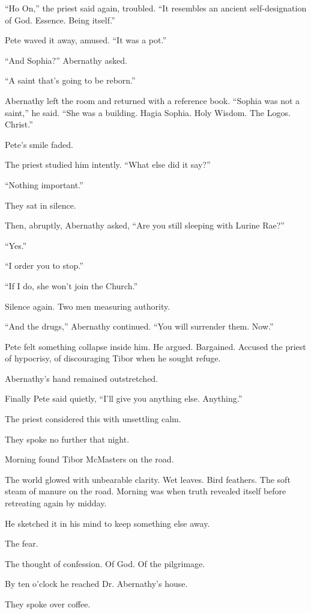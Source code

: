 “Ho On,” the priest said again, troubled. “It resembles an ancient self-designation of God. Essence. Being itself.”

Pete waved it away, amused. “It was a pot.”

“And Sophia?” Abernathy asked.

“A saint that’s going to be reborn.”

Abernathy left the room and returned with a reference book. “Sophia was not a saint,” he said. “She was a building. Hagia Sophia. Holy Wisdom. The Logos. Christ.”

Pete’s smile faded.

The priest studied him intently. “What else did it say?”

“Nothing important.”

They sat in silence.

Then, abruptly, Abernathy asked, “Are you still sleeping with Lurine Rae?”

“Yes.”

“I order you to stop.”

“If I do, she won’t join the Church.”

Silence again. Two men measuring authority.

“And the drugs,” Abernathy continued. “You will surrender them. Now.”

Pete felt something collapse inside him. He argued. Bargained. Accused the priest of hypocrisy, of discouraging Tibor when he sought refuge.

Abernathy’s hand remained outstretched.

Finally Pete said quietly, “I’ll give you anything else. Anything.”

The priest considered this with unsettling calm.

They spoke no further that night.

Morning found Tibor McMasters on the road.

The world glowed with unbearable clarity. Wet leaves. Bird feathers. The soft steam of manure on the road. Morning was when truth revealed itself before retreating again by midday.

He sketched it in his mind to keep something else away.

The fear.

The thought of confession. Of God. Of the pilgrimage.

By ten o’clock he reached Dr. Abernathy’s house.

They spoke over coffee.


